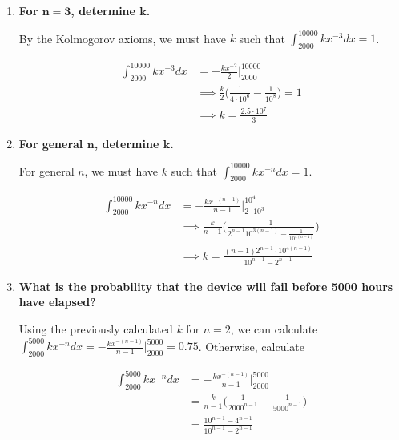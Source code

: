 \documentclass[10pt, oneside]{article}
\begin{document}
\begin{enumerate}[label=4.\arabic*]
\begin{enumerate}
	\item  \begin{tcolorbox}[
	  colback=Cerulean!5!white,
	  colframe=Cerulean!75!black]
	\textbf{For $\bm{n = 3}$, determine $\bm{k}$.}
	\end{tcolorbox}
	
	By the Kolmogorov axioms, we must have $k$ such that $\int^{10000}_{2000} kx^{-3}dx = 1$.

	\begin{align*}
	\int^{10000}_{2000} kx^{-3}dx &= -\frac{kx^{-2}}{2} \big|^{10000}_{2000} \\
	&\implies \frac{k}{2} \Big( \frac{1}{4 \cdot 10^6} - \frac{1}{10^8} \Big) = 1 \\
	&\implies \boxed{k = \frac{2.5 \cdot 10^7}{3}}
	\end{align*}
	
	\item  \begin{tcolorbox}[
	  colback=Cerulean!5!white,
	  colframe=Cerulean!75!black]
	\textbf{For general $\bm{n}$, determine $\bm{k}$.}
	\end{tcolorbox}
	
	For general $n$, we must have $k$ such that $\int^{10000}_{2000} kx^{-n}dx = 1$.
	
	\begin{align*}
	\int^{10000}_{2000} kx^{-n}dx &= -\frac{kx^{-(n-1)}}{n-1} \Big|^{10^4}_{2 \cdot 10^3} \\
	&\implies \frac{k}{n-1} \Bigg( \frac{1}{2^{n-1} 10^{3(n-1)} - \frac{1}{10^{4(n-1)}}} \Bigg) \\
	&\implies \boxed{ k = \frac{(n-1) 2^{n-1} \cdot 10^{4(n-1)}}{10^{n-1} - 2^{n-1}} }
	\end{align*}
	
	\item  \begin{tcolorbox}[
	  colback=Cerulean!5!white,
	  colframe=Cerulean!75!black]
	\textbf{What is the probability that the device will fail before 5000 hours have elapsed?}
	\end{tcolorbox}
	
	Using the previously calculated $k$ for $n=2$, we can calculate $\int^{5000}_{2000} kx^{-n} dx = -\frac{kx^{-(n-1)}}{n-1} \Big|^{5000}_{2000} = \boxed{0.75}$. Otherwise, calculate
	
	\begin{align*}
	\int^{5000}_{2000} kx^{-n} dx &= -\frac{kx^{-(n-1)}}{n-1} \Big|^{5000}_{2000} \\
	&= \frac{k}{n-1} \Bigg( \frac{1}{2000^{n-1}} - \frac{1}{5000^{n-1}} \Bigg) \\
	&= \boxed{ \frac{10^{n-1} - 4^{n-1} }{10^{n-1} - 2^{n-1}} }
	\end{align*}
	

\end{enumerate}
\end{enumerate}
\end{document}
